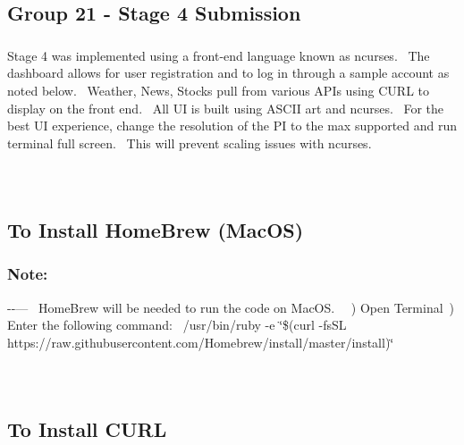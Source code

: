 ~\newline
\subsection*{Group 21 -\/ Stage 4 Submission}

\subparagraph*{}

Stage 4 was implemented using a front-\/end language known as ncurses.~\newline
 The dashboard allows for user registration and to log in through a sample account as noted below.~\newline
 Weather, News, Stocks pull from various A\+P\+Is using C\+U\+RL to display on the front end.~\newline
 All UI is built using A\+S\+C\+II art and ncurses.~\newline
 For the best UI experience, change the resolution of the PI to the max supported and run terminal full screen.~\newline
 This will prevent scaling issues with ncurses.~\newline


\subparagraph*{}

~\newline
\subsection*{To Install Home\+Brew (Mac\+OS)}

\subparagraph*{}

\subsubsection*{Note\+:}

-\/-\/---~\newline
 Home\+Brew will be needed to run the code on Mac\+OS.~\newline
 ~) Open Terminal~) Enter the following command\+:~\newline
 /usr/bin/ruby -\/e \char`\"{}\$(curl -\/fs\+S\+L https\+://raw.\+githubusercontent.\+com/\+Homebrew/install/master/install)\char`\"{}~\newline


\subparagraph*{}

~\newline
\subsection*{To Install C\+U\+RL}

